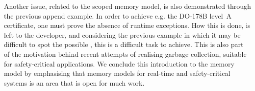 Another issue, related to the scoped memory model, is also demonstrated through the previous  append example. In order to achieve e.g. the DO-178B level~A certificate, one must prove the absence of runtime exceptions\cite{Schoeberl:2007:GCS:1288940.1288953}. How this is done, is left to the developer, and considering the previous example in which it may be difficult to spot the possible , this is a difficult task to achieve. This is also part of the motivation behind recent attempts of realising garbage collection, suitable for safety-critical applications. We conclude this introduction to the memory model by emphasising that memory models for real-time and safety-critical systems is an area that is open for much work. %